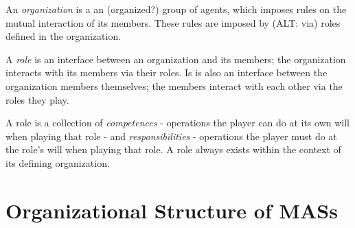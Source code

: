 An \textit{organization} is a an (organized?) group of agents, which imposes rules on the mutual interaction of its members. 
These rules are imposed by (ALT: via) roles defined in the organization.

A \textit{role} is an interface between an organization and its members; the organization interacts with its members via their roles.
Is is also an interface between the organization members themselves; the members interact with each other via the roles they play.

A role is a collection of \textit{competences} - operations the player can do at its own will when playing that role - and \textit{responsibilities} - operations the player must do at the role's will when playing that role.
A role always exists within the context of its defining organization.



\section{Organizational Structure of MASs}
